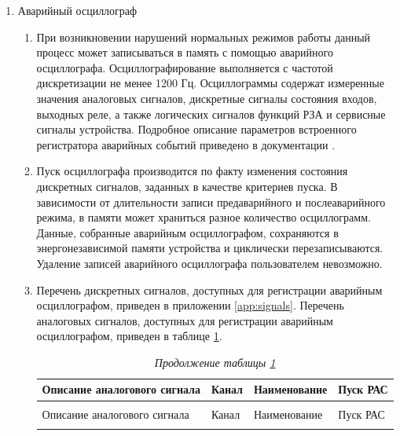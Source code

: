 \begin{enumerate}[label=\arabic{section}.\arabic{subsection}.\arabic*, labelsep=4pt, leftmargin=0pt, itemindent=57pt]
\item Аварийный осциллограф
\begin{enumerate}[label=\arabic{section}.\arabic{subsection}.\arabic{enumi}.\arabic*, labelsep=4pt, leftmargin=0em, itemindent=65pt, parsep=0pt]
\item
При возникновении нарушений нормальных режимов работы данный процесс может записываться в память с помощью аварийного осциллографа.
Осциллографирование выполняется с частотой дискретизации не менее 1200 Гц.
Осциллограммы содержат измеренные значения аналоговых сигналов, дискретные сигналы состояния входов, выходных реле, а также логических сигналов функций РЗА и сервисные сигналы устройства.
Подробное описание параметров встроенного регистратора аварийных событий приведено в документации \ManualUnitGeneral.

\item
Пуск осциллографа производится по факту изменения состояния дискретных сигналов, заданных в качестве критериев пуска.
В зависимости от длительности записи предаварийного и послеаварийного режима, в памяти может храниться разное количество осциллограмм.
Данные, собранные аварийным осциллографом, сохраняются в энергонезависимой памяти устройства и циклически перезаписываются.
Удаление записей аварийного осциллографа пользователем невозможно.

\item
Перечень дискретных сигналов, доступных для регистрации аварийным осциллографом, приведен в приложении \ref{app:signals}.
Перечень аналоговых сигналов, доступных для регистрации аварийным осциллографом, приведен в таблице \ref{osz:tbl1}.

\setlength{\extrarowheight}{0.05cm}
\small
\begin{longtable}{|>{\centering\arraybackslash}m{6.8cm}|>{\centering\arraybackslash}m{2cm}|>{\centering\arraybackslash}m{5.3cm}|>{\centering\arraybackslash}m{2cm}|}
\caption{{\color{red}Перечень аналоговых сигналов, доступных для регистрации аварийным осциллографом}\hfill\vspace{-0.5\baselineskip}}\label{osz:tbl1}\\ 
\hline
\rowcolor{gray!30}
Описание аналогового сигнала & Канал & Наименование  & Пуск РАС \\ 
\hline
\endfirsthead
\caption*{\hspace{3pt}\emph{Продолжение таблицы \ref{osz:tbl1}\hfill\vspace{-0.5\baselineskip}}} \\ %
\hline
\rowcolor{gray!30}
Описание аналогового сигнала & Канал & Наименование  & Пуск РАС \\ 
\endhead
\endfoot
\endlastfoot


\end{longtable}
\end{enumerate}
\end{enumerate}

